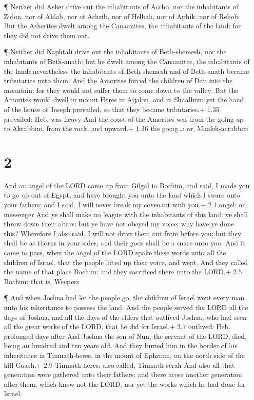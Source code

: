  ¶ Neither did Asher drive out the inhabitants of Accho,
nor the inhabitants of Zidon, nor of Ahlab, nor of Achzib, nor of
Helbah, nor of Aphik, nor of Rehob:  But the Asherites
dwelt among the Canaanites, the inhabitants of the land: for they did
not drive them out.

 ¶ Neither did Naphtali drive out the inhabitants of
Beth-shemesh, nor the inhabitants of Beth-anath; but he dwelt among the
Canaanites, the inhabitants of the land: nevertheless the inhabitants of
Beth-shemesh and of Beth-anath became tributaries unto them.
 And the Amorites forced the children of Dan into the
mountain: for they would not suffer them to come down to the valley:
 But the Amorites would dwell in mount Heres in Aijalon,
and in Shaalbim: yet the hand of the house of Joseph prevailed, so that
they became tributaries.+ 1.35 prevailed: Heb. was heavy 
And the coast of the Amorites was from the going up to Akrabbim, from
the rock, and upward.+ 1.36 the going\ldots: or, Maaleh-acrabbim

\hypertarget{section-1}{%
\section{2}\label{section-1}}

 And an angel of the LORD came up from Gilgal to Bochim, and
said, I made you to go up out of Egypt, and have brought you unto the
land which I sware unto your fathers; and I said, I will never break my
covenant with you.+ 2.1 angel: or, messenger  And ye shall
make no league with the inhabitants of this land; ye shall throw down
their altars: but ye have not obeyed my voice: why have ye done this?
 Wherefore I also said, I will not drive them out from
before you; but they shall be as thorns in your sides, and their gods
shall be a snare unto you.  And it came to pass, when the
angel of the LORD spake these words unto all the children of Israel,
that the people lifted up their voice, and wept.  And they
called the name of that place Bochim: and they sacrificed there unto the
LORD.+ 2.5 Bochim: that is, Weepers

 ¶ And when Joshua had let the people go, the children of
Israel went every man unto his inheritance to possess the land.
 And the people served the LORD all the days of Joshua, and
all the days of the elders that outlived Joshua, who had seen all the
great works of the LORD, that he did for Israel.+ 2.7 outlived: Heb.
prolonged days after  And Joshua the son of Nun, the servant
of the LORD, died, being an hundred and ten years old.  And
they buried him in the border of his inheritance in Timnath-heres, in
the mount of Ephraim, on the north side of the hill Gaash.+ 2.9
Timnath-heres: also called, Timnath-serah  And also all
that generation were gathered unto their fathers: and there arose
another generation after them, which knew not the LORD, nor yet the
works which he had done for Israel.

